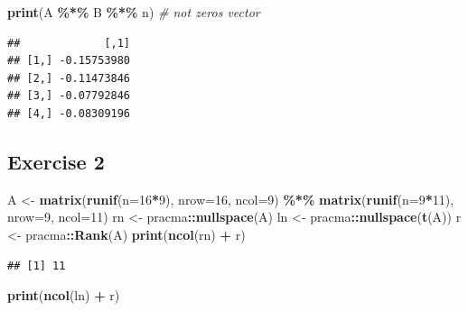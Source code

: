 \documentclass[
]{book}
\newenvironment{Shaded}{\begin{snugshade}}{\end{snugshade}}
\newcommand{\CommentTok}[1]{\textcolor[rgb]{0.56,0.35,0.01}{\textit{#1}}}
\newcommand{\DataTypeTok}[1]{\textcolor[rgb]{0.13,0.29,0.53}{#1}}
\newcommand{\DecValTok}[1]{\textcolor[rgb]{0.00,0.00,0.81}{#1}}
\newcommand{\KeywordTok}[1]{\textcolor[rgb]{0.13,0.29,0.53}{\textbf{#1}}}
\newcommand{\NormalTok}[1]{#1}
\newcommand{\OperatorTok}[1]{\textcolor[rgb]{0.81,0.36,0.00}{\textbf{#1}}}
\newcommand{\StringTok}[1]{\textcolor[rgb]{0.31,0.60,0.02}{#1}}
\begin{document}
\begin{Shaded}
\begin{Highlighting}[]
\KeywordTok{print}\NormalTok{(A }\OperatorTok{\%*\%}\StringTok{ }\NormalTok{B }\OperatorTok{\%*\%}\StringTok{ }\NormalTok{n) }\CommentTok{\# not zeros vector}
\end{Highlighting}
\end{Shaded}

\begin{verbatim}
##             [,1]
## [1,] -0.15753980
## [2,] -0.11473846
## [3,] -0.07792846
## [4,] -0.08309196
\end{verbatim}

\hypertarget{exercise-2-4}{%
\subsection*{Exercise 2}\label{exercise-2-4}}

\begin{Shaded}
\begin{Highlighting}[]
\NormalTok{A \textless{}{-}}\StringTok{ }\KeywordTok{matrix}\NormalTok{(}\KeywordTok{runif}\NormalTok{(}\DataTypeTok{n=}\DecValTok{16}\OperatorTok{*}\DecValTok{9}\NormalTok{), }\DataTypeTok{nrow=}\DecValTok{16}\NormalTok{, }\DataTypeTok{ncol=}\DecValTok{9}\NormalTok{) }\OperatorTok{\%*\%}\StringTok{ }\KeywordTok{matrix}\NormalTok{(}\KeywordTok{runif}\NormalTok{(}\DataTypeTok{n=}\DecValTok{9}\OperatorTok{*}\DecValTok{11}\NormalTok{), }\DataTypeTok{nrow=}\DecValTok{9}\NormalTok{, }\DataTypeTok{ncol=}\DecValTok{11}\NormalTok{)}
\NormalTok{rn \textless{}{-}}\StringTok{ }\NormalTok{pracma}\OperatorTok{::}\KeywordTok{nullspace}\NormalTok{(A)}
\NormalTok{ln \textless{}{-}}\StringTok{ }\NormalTok{pracma}\OperatorTok{::}\KeywordTok{nullspace}\NormalTok{(}\KeywordTok{t}\NormalTok{(A))}
\NormalTok{r \textless{}{-}}\StringTok{ }\NormalTok{pracma}\OperatorTok{::}\KeywordTok{Rank}\NormalTok{(A)}
\KeywordTok{print}\NormalTok{(}\KeywordTok{ncol}\NormalTok{(rn) }\OperatorTok{+}\StringTok{ }\NormalTok{r)}
\end{Highlighting}
\end{Shaded}

\begin{verbatim}
## [1] 11
\end{verbatim}

\begin{Shaded}
\begin{Highlighting}[]
\KeywordTok{print}\NormalTok{(}\KeywordTok{ncol}\NormalTok{(ln) }\OperatorTok{+}\StringTok{ }\NormalTok{r)}
\end{Highlighting}
\end{Shaded}
\end{document}
